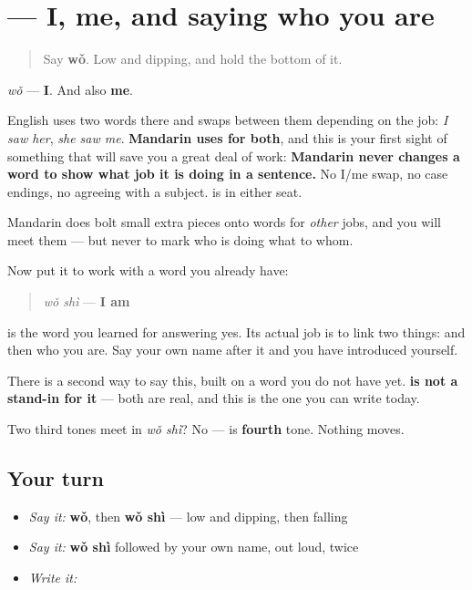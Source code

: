 \section[\texorpdfstring{\zh{我} (wǒ)}{我 (wǒ)}]{ — I, me, and saying who you are}

\label{lesson:ZH-C08-wo}



\begin{quote}
Say \textbf{wǒ}. Low and dipping, and hold the bottom of it.
\end{quote}

\begin{cousinweb}
\textbf{} \emph{wǒ} — \textbf{I}. And also \textbf{me}.

English uses two words there and swaps between them depending on the job: \emph{I saw her}, \emph{she saw me}. \textbf{Mandarin uses  for both}, and this is your first sight of something that will save you a great deal of work: \textbf{Mandarin never changes a word to show what job it is doing in a sentence.} No I/me swap, no case endings, no agreeing with a subject.  is  in either seat.

Mandarin does bolt small extra pieces onto words for \emph{other} jobs, and you will meet them — but never to mark who is doing what to whom.

Now put it to work with a word you already have:

\begin{quote}
\textbf{} \emph{wǒ shì} — \textbf{I am}
\end{quote}

 is the word you learned for answering yes. Its actual job is to link two things: \textbf{} and then who you are. Say your own name after it and you have introduced yourself.

There is a second way to say this, built on a word you do not have yet. \textbf{ is not a stand-in for it} — both are real, and this is the one you can write today.

Two third tones meet in \emph{wǒ shì}? No —  is \textbf{fourth} tone. Nothing moves.
\end{cousinweb}

\subsection*{Your turn}
\begin{itemize}
\raggedright
  \item \emph{Say it:} \textbf{wǒ}, then \textbf{wǒ shì} — low and dipping, then falling
  \item \emph{Say it:} \textbf{wǒ shì} followed by your own name, out loud, twice
  \item \emph{Write it:} 
\end{itemize}

